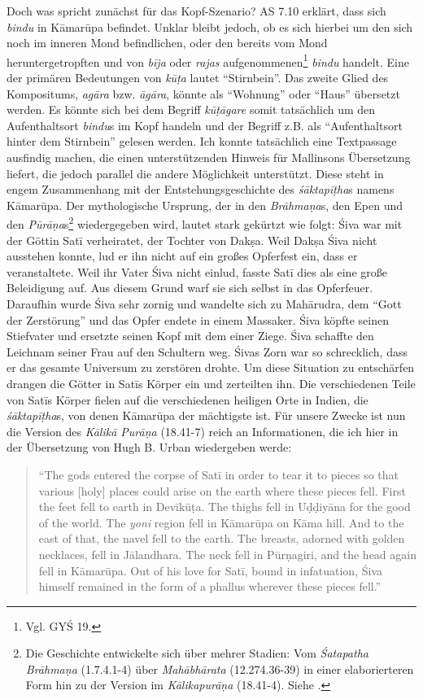 \documentclass[a4paper,12pt]{article}
\begin{document}
Doch was spricht zunächst für das Kopf-Szenario? AS 7.10 erklärt, dass sich \textit{bindu} in Kāmarūpa befindet. Unklar bleibt jedoch, ob es sich hierbei um den sich noch im inneren Mond befindlichen, oder den bereits vom Mond heruntergetropften und von \textit{bīja} oder \textit{rajas} aufgenommenen\footnote{Vgl. GYŚ 19.} \textit{bindu} handelt. Eine der primären Bedeutungen von \textit{kūṭa} lautet ``Stirnbein''. Das zweite Glied des Kompositums, \textit{agāra} bzw. \textit{āgāra}, könnte als ``Wohnung'' oder ``Haus'' übersetzt werden. Es könnte sich bei dem Begriff \textit{kūṭāgare} somit tatsächlich um den Aufenthaltsort \textit{bindu}s im Kopf handeln und der Begriff z.B. als ``Aufenthaltsort hinter dem Stirnbein'' gelesen werden. Ich konnte tatsächlich eine Textpassage ausfindig machen, die einen unterstützenden Hinweis für Mallinsons Übersetzung liefert, die jedoch parallel die andere Möglichkeit unterstützt. Diese steht in engem Zusammenhang mit der Entstehungsgeschichte des \textit{śāktapīṭha}s namens Kāmarūpa. Der mythologische Ursprung, der in den \textit{Brāhmaṇa}s, den Epen und den \textit{Pūrāṇa}s\footnote{Die Geschichte entwickelte sich über mehrer Stadien: Vom \textit{Śatapatha Brāhmaṇa} (1.7.4.1-4) über \textit{Mahābhārata} (12.274.36-39) in einer elaborierteren Form hin zu der Version im \textit{Kālikapurāṇa} (18.41-4). Siehe \parencite[34-35]{urban2010}.} wiedergegeben wird, lautet stark gekürtzt wie folgt: Śiva war mit der Göttin Satī verheiratet, der Tochter von Dakṣa. Weil Dakṣa Śiva nicht ausstehen konnte, lud er ihn nicht auf ein großes Opferfest ein, dass er veranstaltete. Weil ihr Vater Śiva nicht einlud, fasste Satī dies als eine große Beleidigung auf. Aus diesem Grund warf sie sich selbst in das Opferfeuer. Daraufhin wurde Śiva sehr zornig und wandelte sich zu Mahārudra, dem ``Gott der Zerstörung'' und das Opfer endete in einem Massaker. Śiva köpfte seinen Stiefvater und ersetzte seinen Kopf mit dem einer Ziege. Śiva schaffte den Leichnam seiner Frau auf den Schultern weg. Śivas Zorn war so schrecklich, dass er das gesamte Universum zu zerstören drohte. Um diese Situation zu entschärfen drangen die Götter in Satīs Körper ein und zerteilten ihn. Die verschiedenen Teile von Satīs Körper fielen auf die verschiedenen heiligen Orte in Indien, die \textit{śāktapīṭha}s, von denen Kāmarūpa der mächtigste ist. Für unsere Zwecke ist nun die Version des \textit{Kālikā Purāṇa} (18.41-7) reich an Informationen, die ich hier in der Übersetzung von Hugh B. Urban wiedergeben werde:

\begin{quote}``The gods entered the corpse of Satī in order to tear it to pieces so that various [holy] places could arise on the earth where these pieces fell. First the feet fell to earth in Devīkūṭa. The thighs fell in Uḍḍiyāna for the good of the world. The \textit{yoni} region fell in Kāmarūpa on Kāma hill. And to the east of that, the navel fell to the earth. The breasts, adorned with golden necklaces, fell in Jālandhara. The neck fell in Pūrṇagiri, and the head again fell in Kāmarūpa. Out of his love for Satī, bound in infatuation, Śiva himself remained in the form of a phallus wherever these pieces fell.'' \parencite[35]{urban2010} \end{quote}
\end{document}
